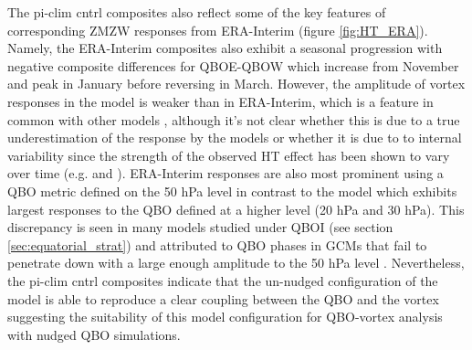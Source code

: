 The pi-clim cntrl composites also reflect some of the key features of corresponding ZMZW responses from ERA-Interim (figure \ref{fig:HT_ERA}). Namely, the ERA-Interim composites also exhibit a seasonal progression with negative composite differences for QBOE-QBOW which increase from November and peak in January before reversing in March. However, the amplitude of vortex responses in the model is weaker than in ERA-Interim, which is a feature in common with other models \citep{ansteyTeleconnections2021}, although it's not clear whether this is due to a true underestimation of the response by the models or whether it is due to to internal variability since the strength of the observed HT effect has been shown to vary over time (e.g. \cite{luDecadalscale2008c} and \cite{luMechanisms2014c}). ERA-Interim responses are also most prominent using a QBO metric defined on the 50 hPa level in contrast to the model which exhibits largest responses to the QBO defined at a higher level (20 hPa and 30 hPa). This discrepancy is seen in many models studied under QBOI (see section \ref{sec:equatorial_strat}) and attributed to QBO phases in GCMs that fail to penetrate down with a large enough amplitude to the 50 hPa level \citep{ansteyTeleconnections2021}. Nevertheless, the pi-clim cntrl composites indicate that the un-nudged configuration of the model is able to reproduce a clear coupling between the QBO and the vortex suggesting the suitability of this model configuration for QBO-vortex analysis with nudged QBO simulations.

